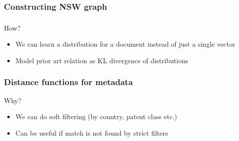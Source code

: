 \documentclass{beamer}
\begin{document}
  \begin{frame}
    \frametitle{Constructing NSW graph}  
    \Large
   	\begin{itemize}
	\end{itemize}   
  \end{frame}

  \begin{frame}
    \frametitle{}  
    \Large How?
   	\begin{itemize}
		\item We can learn a distribution for a document instead of just a single vector
		\item Model prior art relation as KL divergence of distributions
	\end{itemize}   
  \end{frame}

  \begin{frame}
    \frametitle{Distance functions for metadata}  
    \Large Why?
   	\begin{itemize}
		\item We can do soft filtering (by country, patent class etc.)
		\item Can be useful if match is not found by strict filters
	\end{itemize}   
  \end{frame}
\end{document}
